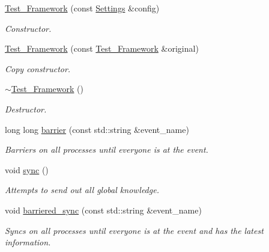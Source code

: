 \begin{DoxyCompactItemize}
\item 
\hyperlink{classMadara_1_1KATS_1_1Test__Framework_ae5bf7d428f920193c77465e0b6420ec3}{Test\_\-Framework} (const \hyperlink{classMadara_1_1KATS_1_1Settings}{Settings} \&config)
\begin{DoxyCompactList}\small\item\em Constructor. \item\end{DoxyCompactList}\item 
\hyperlink{classMadara_1_1KATS_1_1Test__Framework_a4db967f33f561b3de4f903d70a422695}{Test\_\-Framework} (const \hyperlink{classMadara_1_1KATS_1_1Test__Framework}{Test\_\-Framework} \&original)
\begin{DoxyCompactList}\small\item\em Copy constructor. \item\end{DoxyCompactList}\item 
\hyperlink{classMadara_1_1KATS_1_1Test__Framework_afc41edcb8e68e5222d52b437af60c40f}{$\sim$Test\_\-Framework} ()
\begin{DoxyCompactList}\small\item\em Destructor. \item\end{DoxyCompactList}\item 
long long \hyperlink{classMadara_1_1KATS_1_1Test__Framework_a9c3aafb4c0b662a38ee89ea3c49ffe2d}{barrier} (const std::string \&event\_\-name)
\begin{DoxyCompactList}\small\item\em Barriers on all processes until everyone is at the event. \item\end{DoxyCompactList}\item 
void \hyperlink{classMadara_1_1KATS_1_1Test__Framework_aa293ba03365b043f65aff22c8cb195a7}{sync} ()
\begin{DoxyCompactList}\small\item\em Attempts to send out all global knowledge. \item\end{DoxyCompactList}\item 
void \hyperlink{classMadara_1_1KATS_1_1Test__Framework_a2723c592f6d0dd6a4d1dcadd20b14257}{barriered\_\-sync} (const std::string \&event\_\-name)
\begin{DoxyCompactList}\small\item\em Syncs on all processes until everyone is at the event and has the latest information. \item\end{DoxyCompactList}\item 

\end{DoxyCompactItemize}
